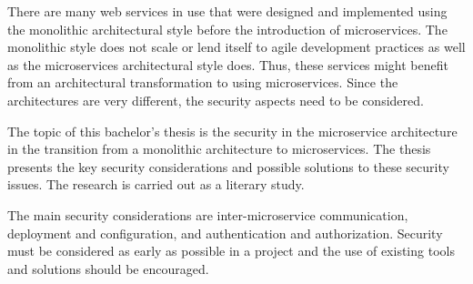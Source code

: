 \begin{enabstract}
    \begin{sloppypar}
        There are many web services in use that were designed and implemented
        using the monolithic architectural style before the introduction of
        microservices. The monolithic style does not scale or lend itself to
        agile development practices as well as the microservices architectural
        style does. Thus, these services might benefit from an architectural
        transformation to using microservices. Since the architectures are very
        different, the security aspects need to be considered.
    \end{sloppypar}
    \begin{sloppypar}
        The topic of this bachelor's thesis is the security in the microservice
        architecture in the transition from a monolithic architecture to
        microservices. The thesis presents the key security considerations and
        possible solutions to these security issues. The research is carried out
        as a literary study.
    \end{sloppypar}
    \begin{sloppypar}
        The main security considerations are inter-microservice communication,
        deployment and configuration, and authentication and authorization.
        Security must be considered as early as possible in a project and the
        use of existing tools and solutions should be encouraged.
    \end{sloppypar}
\end{enabstract}

